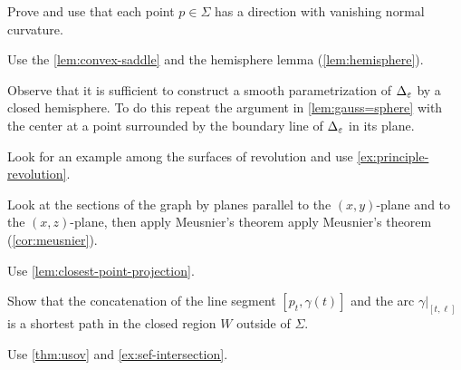  Prove and use that each point $p\in\Sigma$ has a direction with vanishing normal curvature.




 Use the \ref{lem:convex-saddle} and the hemisphere lemma (\ref{lem:hemisphere}).


 Observe that it is sufficient to construct a smooth parametrization of $\Delta_\varepsilon$ by a closed hemisphere.
To do this repeat the argument in \ref{lem:gauss=sphere} with the center at a point surrounded by the boundary line of $\Delta_\varepsilon$ in its plane.


 Look for an example among the surfaces of revolution and use \ref{ex:principle-revolution}.

 Look at the sections of the graph by planes parallel to the $(x,y)$-plane and to the $(x,z)$-plane, then apply Meusnier’s theorem apply Meusnier's theorem (\ref{cor:meusnier}).



 Use \ref{lem:closest-point-projection}.









 Show that the concatenation of the line segment $[p_t,\gamma(t)]$ and the arc $\gamma|_{[t,\ell]}$ is a shortest path in the closed region $W$ outside of $\Sigma$.



 Use \ref{thm:usov} and \ref{ex:sef-intersection}.

